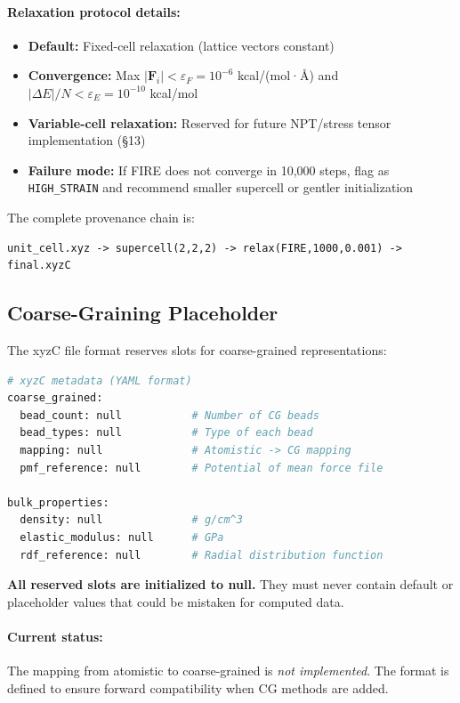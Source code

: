 \documentclass[11pt]{article}
\begin{document}
\paragraph{Relaxation protocol details:}

\begin{itemize}
\item \textbf{Default:} Fixed-cell relaxation (lattice vectors constant)
\item \textbf{Convergence:} Max $|\mathbf{F}_i| < \varepsilon_F = 10^{-6}$ kcal/(mol·Å) and $|\Delta E|/N < \varepsilon_E = 10^{-10}$ kcal/mol
\item \textbf{Variable-cell relaxation:} Reserved for future NPT/stress tensor implementation (§13)
\item \textbf{Failure mode:} If FIRE does not converge in 10,000 steps, flag as \texttt{HIGH\_STRAIN} and recommend smaller supercell or gentler initialization
\end{itemize}

The complete provenance chain is:
\begin{verbatim}
unit_cell.xyz -> supercell(2,2,2) -> relax(FIRE,1000,0.001) -> final.xyzC
\end{verbatim}

\subsection{Coarse-Graining Placeholder}

The xyzC file format reserves slots for coarse-grained representations:

\begin{lstlisting}[language=Python]
# xyzC metadata (YAML format)
coarse_grained:
  bead_count: null           # Number of CG beads
  bead_types: null           # Type of each bead
  mapping: null              # Atomistic -> CG mapping
  pmf_reference: null        # Potential of mean force file
  
bulk_properties:
  density: null              # g/cm^3
  elastic_modulus: null      # GPa
  rdf_reference: null        # Radial distribution function
\end{lstlisting}

\textbf{All reserved slots are initialized to null.} They must never contain default or placeholder values that could be mistaken for computed data.

\paragraph{Current status:} The mapping from atomistic to coarse-grained is \textit{not implemented}. The format is defined to ensure forward compatibility when CG methods are added.
\end{document}

